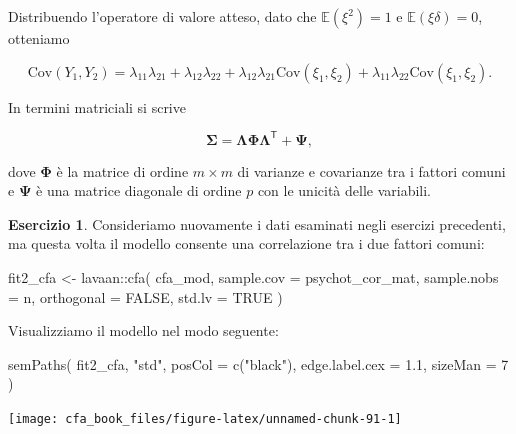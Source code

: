 \documentclass[
  11pt,
]{krantz}
\makeatletter
\newenvironment{Shaded}{\begin{snugshade}}{\end{snugshade}}
\newcommand{\AttributeTok}[1]{\textcolor[rgb]{0.61,0.61,0.61}{#1}}
\newcommand{\ConstantTok}[1]{\textcolor[rgb]{0,0,0}{#1}}
\newcommand{\DecValTok}[1]{\textcolor[rgb]{0.06,0.06,0.06}{#1}}
\newcommand{\FloatTok}[1]{\textcolor[rgb]{0.06,0.06,0.06}{#1}}
\newcommand{\FunctionTok}[1]{\textcolor[rgb]{0,0,0}{#1}}
\newcommand{\NormalTok}[1]{#1}
\newcommand{\OtherTok}[1]{\textcolor[rgb]{0.37,0.37,0.37}{#1}}
\newcommand{\SpecialCharTok}[1]{\textcolor[rgb]{0,0,0}{#1}}
\newcommand{\StringTok}[1]{\textcolor[rgb]{0.5,0.5,0.5}{#1}}
\newenvironment{kframe}{%
\medskip{}
\setlength{\fboxsep}{.8em}
 \def\at@end@of@kframe{}%
 \ifinner\ifhmode%
  \def\at@end@of@kframe{\end{minipage}}%
  \begin{minipage}{\columnwidth}%
 \fi\fi%
 \def\FrameCommand##1{\hskip\@totalleftmargin \hskip-\fboxsep
 \colorbox{shadecolor}{##1}\hskip-\fboxsep
     \hskip-\linewidth \hskip-\@totalleftmargin \hskip\columnwidth}%
 \MakeFramed {\advance\hsize-\width
   \@totalleftmargin\z@ \linewidth\hsize
   \@setminipage}}%
 {\par\unskip\endMakeFramed%
 \at@end@of@kframe}
\renewenvironment{Shaded}{\begin{kframe}}{\end{kframe}}
\newcommand{\E}{\mathbb{E}} %
\theoremstyle{definition}
\theoremstyle{definition}
\theoremstyle{definition}
\newtheorem{exercise}{Esercizio}[chapter]
\theoremstyle{definition}
\theoremstyle{remark}
\makeatother
\begin{document}
Distribuendo l'operatore di valore atteso, dato che \(\E(\xi^2)=1\) e \(\E(\xi \delta)=0\), otteniamo

\[
\mbox{Cov}(Y_1, Y_2) = \lambda_{11} \lambda_{21} + \lambda_{12} \lambda_{22} + 
\lambda_{12} \lambda_{21}\mbox{Cov}(\xi_1, \xi_2) +\lambda_{11} \lambda_{22}\mbox{Cov}(\xi_1, \xi_2).
\]

In termini matriciali si scrive

\[
\boldsymbol{\Sigma} =\boldsymbol{\Lambda} \boldsymbol{\Phi} \boldsymbol{\Lambda}^{\mathsf{T}} + \boldsymbol{\Psi}, 
\]

dove \(\boldsymbol{\Phi}\) è la matrice di ordine \(m \times m\) di varianze e covarianze tra i fattori comuni e \(\boldsymbol{\Psi}\) è una matrice diagonale di ordine \(p\) con le unicità delle variabili.

\begin{exercise}

Consideriamo nuovamente i dati esaminati negli esercizi precedenti, ma questa volta il modello consente una correlazione tra i due fattori comuni:

\begin{Shaded}
\begin{Highlighting}[]
\NormalTok{fit2\_cfa }\OtherTok{\textless{}{-}}\NormalTok{ lavaan}\SpecialCharTok{::}\FunctionTok{cfa}\NormalTok{(}
\NormalTok{  cfa\_mod,}
  \AttributeTok{sample.cov =}\NormalTok{ psychot\_cor\_mat,}
  \AttributeTok{sample.nobs =}\NormalTok{ n,}
  \AttributeTok{orthogonal =} \ConstantTok{FALSE}\NormalTok{,}
  \AttributeTok{std.lv =} \ConstantTok{TRUE}
\NormalTok{)}
\end{Highlighting}
\end{Shaded}

Visualizziamo il modello nel modo seguente:

\begin{Shaded}
\begin{Highlighting}[]
\FunctionTok{semPaths}\NormalTok{(}
\NormalTok{  fit2\_cfa,}
  \StringTok{"std"}\NormalTok{,}
  \AttributeTok{posCol =} \FunctionTok{c}\NormalTok{(}\StringTok{"black"}\NormalTok{),}
  \AttributeTok{edge.label.cex =} \FloatTok{1.1}\NormalTok{,}
  \AttributeTok{sizeMan =} \DecValTok{7}
\NormalTok{)}
\end{Highlighting}
\end{Shaded}

\begin{center}\texttt{[image: cfa\_book\_files/figure-latex/unnamed-chunk-91-1]} \end{center}


\end{exercise}
\end{document}
